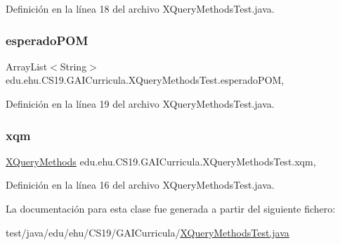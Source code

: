 Definición en la línea 18 del archivo X\+Query\+Methods\+Test.\+java.

\mbox{\label{a00036_ab6d2fa743081f2227d9a4e00d9718458}} 
\subsubsection{\texorpdfstring{esperadoPOM}{esperadoPOM}}
{\footnotesize\ttfamily Array\+List$<$String$>$ edu.\+ehu.\+C\+S19.\+G\+A\+I\+Curricula.\+X\+Query\+Methods\+Test.\+esperado\+P\+OM\hspace{0.3cm}{\ttfamily [static]}, {\ttfamily [package]}}



Definición en la línea 19 del archivo X\+Query\+Methods\+Test.\+java.

\mbox{\label{a00036_a39a41e2d9871da80d3ac11ea85702ed3}} 
\subsubsection{\texorpdfstring{xqm}{xqm}}
{\footnotesize\ttfamily \mbox{\hyperlink{a00032}{X\+Query\+Methods}} edu.\+ehu.\+C\+S19.\+G\+A\+I\+Curricula.\+X\+Query\+Methods\+Test.\+xqm\hspace{0.3cm}{\ttfamily [static]}, {\ttfamily [package]}}



Definición en la línea 16 del archivo X\+Query\+Methods\+Test.\+java.



La documentación para esta clase fue generada a partir del siguiente fichero\+:\begin{DoxyCompactItemize}
\item 
test/java/edu/ehu/\+C\+S19/\+G\+A\+I\+Curricula/\mbox{\hyperlink{a00011}{X\+Query\+Methods\+Test.\+java}}\end{DoxyCompactItemize}

